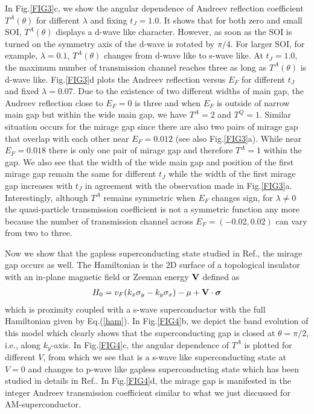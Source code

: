 \documentclass[aps, prb, twocolumn, amssymb, amsmath, showpacs, superscriptaddress]{revtex4-1}
\begin{document}
In Fig.\ref{FIG3}c, we show the angular dependence of Andreev reflection coefficient $T^A(\theta)$ for different $\lambda$ and fixing $t_J=1.0$. It shows that for both zero and small SOI, $T^A(\theta)$ displays a d-wave like character. However, as soon as the SOI is turned on the symmetry axis of the d-wave is rotated by $\pi/4$. For larger SOI, for example, $\lambda=0.1$, $T^A(\theta)$ changes from d-wave like to s-wave like. At $t_J=1.0$, the maximum number of transmission channel reaches three as long as $T^A(\theta)$ is d-wave like.
Fig.\ref{FIG3}d plots the Andreev reflection versus $E_F$ for different $t_J$ and fixed $\lambda=0.07$. Due to the existence of two different widths of main gap, the Andreev reflection close to $E_F=0$ is three and when $E_F$ is outside of narrow main gap but within the wide main gap, we have $T^A=2$ and $T^Q=1$. Similar situation occurs for the mirage gap since there are also two pairs of mirage gap that overlap with each other near $E_F=0.012$ (see also Fig.\ref{FIG3}a). While near $E_F=0.018$ there is only one pair of mirage gap and therefore $T^A=1$ within the gap. We also see that the width of the wide main gap and position of the first mirage gap remain the same for different $t_J$ while the width of the first mirage gap increases with $t_J$ in agreement with the observation made in Fig.\ref{FIG3}a.
Interestingly, although $T^A$ remains symmetric when $E_F$ changes sign, for $\lambda \ne 0$ the quasi-particle transmission coefficient is not a symmetric function any more because the number of transmission channel across $E_F = (-0.02, 0.02)$ can vary from two to three.

Now we show that the gapless superconducting state studied in Ref., the mirage gap occurs as well. The Hamiltonian is the 2D surface of a topological insulator with an in-plane magnetic field or Zeeman energy ${\bf V}$ defined as
\begin{eqnarray}
H_0 = v_F (k_x \sigma_y - k_y \sigma_x) - \mu +{\bf V} \cdot \boldsymbol{\sigma} \label{Fu}
\end{eqnarray}
which is proximity coupled with a s-wave superconductor with the full Hamiltonian given by Eq.(\ref{ham}).
In Fig.\ref{FIG4}b, we depict the band evolution of this model which clearly shows that the superconducting gap is closed at $\theta=\pi/2$, i.e., along $k_y$-axis. In Fig.\ref{FIG4}c, the angular dependence of $T^A$ is plotted for different $V$, from which we see that is a s-wave like superconducting state at $V=0$ and changes to p-wave like gapless superconducting state which has been studied in details in Ref.. In Fig.\ref{FIG4}d, the mirage gap is manifested in the integer Andreev transmission coefficient similar to what we just discussed for AM-superconductor.
\end{document}
